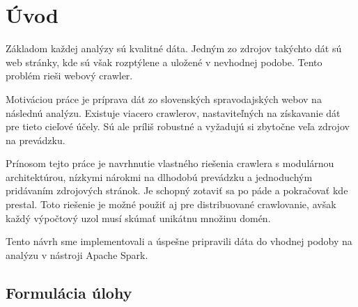 
{}

\chapter*{Úvod}

Základom každej analýzy sú kvalitné dáta. Jedným zo zdrojov takýchto dát sú web stránky, kde sú však rozptýlene a uložené v nevhodnej podobe. Tento problém rieši webový crawler.

Motiváciou práce je príprava dát zo slovenských spravodajských webov na následnú analýzu. Existuje viacero crawlerov, nastaviteľných na získavanie dát pre tieto cieľové účely. Sú ale príliš robustné a vyžadujú si zbytočne veľa zdrojov na prevádzku. 

Prínosom tejto práce je navrhnutie vlastného riešenia crawlera s modulárnou architektúrou, nízkymi nárokmi na dlhodobú prevádzku a jednoduchým pridávaním zdrojových stránok. Je schopný zotaviť sa po páde a pokračovať kde prestal. Toto riešenie je možné použiť aj pre distribuované crawlovanie, avšak každý výpočtový uzol musí skúmať unikátnu množinu domén. 

Tento návrh sme implementovali a úspešne pripravili dáta do vhodnej podoby na analýzu v nástroji Apache Spark. 












\section*{Formulácia úlohy}

